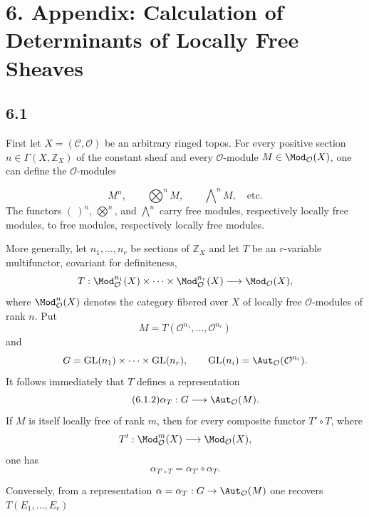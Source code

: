 \section*{6. Appendix: Calculation of Determinants of Locally Free Sheaves}

\subsection*{6.1}
First let $X=(\mathcal C,\mathcal O)$ be an arbitrary ringed topos. For every
positive section $n\in\Gamma(X,\mathbb Z_X)$ of the constant sheaf and every
$\mathcal O$-module $M\in\Mod_{\mathcal O}(X)$, one can define the
$\mathcal O$-modules

\begin{equation}\tag{6.1.1}
M^n,\qquad \bigotimes\nolimits^n M,\qquad
\bigwedge\nolimits^n M,\quad\text{etc.}
\end{equation}
The functors $(\ )^n$, $\bigotimes^n$, and $\bigwedge^n$ carry free modules,
respectively locally free modules, to free modules, respectively locally free
modules.

More generally, let $n_1,\ldots,n_r$ be sections of $\mathbb Z_X$ and let
$T$ be an $r$-variable multifunctor, covariant for definiteness,
\[
T:\Mod_{\mathcal O}^{n_1}(X)\times\cdots\times
\Mod_{\mathcal O}^{n_r}(X)\longrightarrow\Mod_{\mathcal O}(X),
\]
where $\Mod_{\mathcal O}^n(X)$ denotes the category fibered over $X$ of
locally free $\mathcal O$-modules of rank $n$. Put
\[
M=T(\mathcal O^{n_1},\ldots,\mathcal O^{n_r})
\]
and
\[
G=\GL(n_1)\times\cdots\times\GL(n_r),
\qquad
\GL(n_i)=\Aut_{\mathcal O}(\mathcal O^{n_i}).
\]
It follows immediately that $T$ defines a representation
\begin{equation}\tag{6.1.2}
\alpha_T:G\longrightarrow\Aut_{\mathcal O}(M).
\end{equation}
If $M$ is itself locally free of rank $m$, then for every composite functor
$T'\circ T$, where
\[
T':\Mod_{\mathcal O}^m(X)\longrightarrow\Mod_{\mathcal O}(X),
\]
one has
\begin{equation}\tag{6.1.3}
\alpha_{T'\circ T}=\alpha_{T'}\circ\alpha_T.
\end{equation}

Conversely, from a representation
$\alpha=\alpha_T:G\to\Aut_{\mathcal O}(M)$ one recovers
$T(E_1,\ldots,E_r)$

